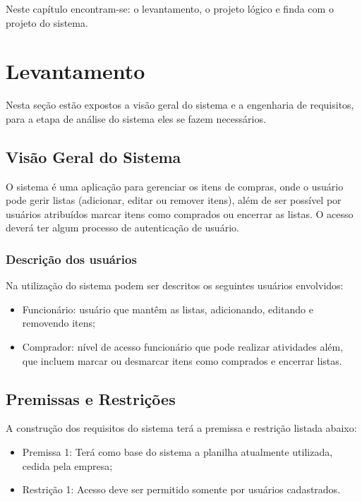 \documentclass[
	12pt,
	openright,
	oneside, %
	a4paper,
	chapter=TITLE,
	section=TITLE,
	english,
	brazil %
	]{abntex2-udesc}
\begin{document}
Neste capítulo encontram-se: o levantamento, o projeto lógico e finda com o projeto do sistema.

\section{Levantamento}

Nesta seção estão expostos a visão geral do sistema e a engenharia de requisitos, para a etapa de análise do sistema eles se fazem necessários.

\subsection{Visão Geral do Sistema}

O sistema é uma aplicação para gerenciar os itens de compras, onde o usuário pode gerir listas (adicionar, editar ou remover itens), além de ser possível por usuários atribuídos marcar itens como comprados ou encerrar as listas. O acesso deverá ter algum processo de autenticação de usuário.

\subsubsection{Descrição dos usuários}

Na utilização do sistema podem ser descritos os seguintes usuários envolvidos:
\begin{itemize}
\item Funcionário: usuário que mantêm as listas, adicionando, editando e removendo itens;
\item Comprador: nível de acesso funcionário que pode realizar atividades além, que incluem marcar ou desmarcar itens como comprados e encerrar listas.
\end{itemize}

\subsection{Premissas e Restrições}

A construção dos requisitos do sistema terá a premissa e restrição listada abaixo:
\begin{itemize}
\item Premissa 1: Terá como base do sistema a planilha atualmente utilizada, cedida pela empresa;
\item Restrição 1: Acesso deve ser permitido somente por usuários cadastrados.
\end{itemize}
\end{document}
